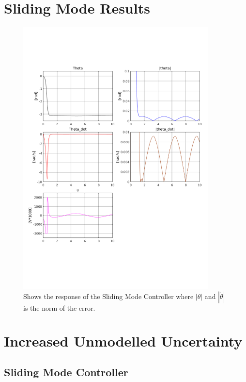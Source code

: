\chapter{Sliding Mode Results} %
\label{cha:sliding_mode}
\begin{figure}[H]
        \centering
        \includegraphics[width=0.9\textwidth,trim=0.5cm 5cm 0.5cm 4cm, clip]{smc.pdf}
        \caption{Shows the response of the Sliding Mode Controller where $|\theta|$ and $|\dot{\theta}|$ is the norm of the error.}
        \label{fig:smc}
\end{figure}

\chapter{Increased Unmodelled Uncertainty} %
\label{cha:extreme_dis}
\section{Sliding Mode Controller} %
\label{sec:sliding_mode_controller}

